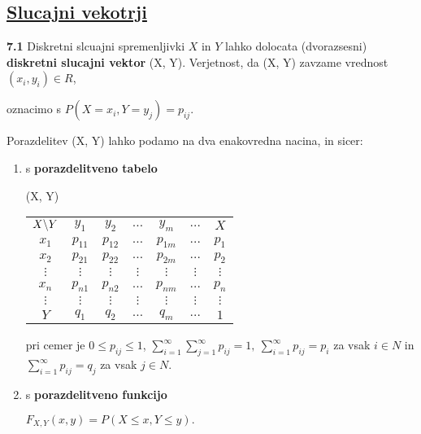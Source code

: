\documentclass{article}
\begin{document}
\begin{multicols}{3}
\section{\underline{Slucajni vekotrji}}

\textbf{7.1} Diskretni slcuajni spremenljivki $X$ in $Y$  lahko
dolocata (dvorazsesni) \textbf{diskretni slucajni vektor} (X, Y).
Verjetnost, da (X, Y) zavzame vrednost $(x_i, y_i) \in R$,

\begin{center}
    oznacimo s $P(X = x_i, Y = y_j) = p_{ij}$.
\end{center}

Porazdelitev (X, Y) lahko podamo na dva enakovredna nacina, in sicer:

\begin{enumerate}
    \item s \textbf{porazdelitveno tabelo}
        \begin{center}
            \begin{tiny}
                (X, Y)
                \begin{tabular}{ |c|c|c|c|c|c|c| } 
                    \hline
                        $ X \symbol{92} Y $ & $y_1$ & $y_2$ & $\dots$ & $y_m$ & $\dots$ & $X$ \\
                        \cline{1-7}
                        $x_1$ & $p_{11}$ & $p_{12}$ & $\dots$ & $p_{1m}$ & $\dots$ & $p_1$ \\
                        $x_2$ & $p_{21}$ & $p_{22}$ & $\dots$ & $p_{2m}$ & $\dots$ & $p_2$ \\
                        $\vdots$ & $\vdots$ & $\vdots$ & $\vdots$ & $\vdots $ & $\vdots$ & $\vdots$ \\
                        $x_n$ & $p_{n1}$ & $p_{n2}$ & $\dots$ & $p_{nm}$ & $\dots$ & $p_n$ \\
                        $\vdots$ & $\vdots$ & $\vdots$ & $\vdots$ & $\vdots $ & $\vdots$ & $\vdots$ \\
                        \cline{1-7}
                        $ Y $ & $q_1$ & $q_2$ & $\dots$ & $q_m$ & $\dots$ & $1$ \\
                    \hline
                    \end{tabular}
            \end{tiny}
        \end{center}
        pri cemer je $0 \leq p_{ij} \leq 1$,
        \begin{math}
            \sum_{i = 1}^{\infty} \sum_{j = 1}^{\infty} p_{ij} = 1,\:
            \sum_{i = 1}^{\infty} p_{ij} = p_i
        \end{math} za vsak $i \in N$ in
        \begin{math}
            \sum_{i = 1}^{\infty} p_{ij} = q_j
        \end{math} za vsak $j \in N$.
    \item s \textbf{porazdelitveno funkcijo}
        \begin{center}
            \begin{math}
                F_{X,Y}(x, y) = P(X \leq x, Y \leq y).
            \end{math}
            

\end{center}
\end{enumerate}
\end{multicols}
\end{document}
